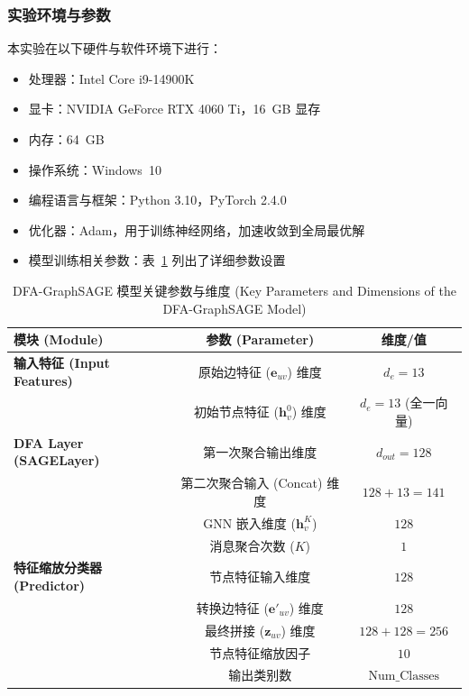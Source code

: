 \documentclass{article}
\begin{document}
\subsubsection{实验环境与参数}
本实验在以下硬件与软件环境下进行：
\begin{itemize}
  \item 处理器：Intel Core i9-14900K
  \item 显卡：NVIDIA GeForce RTX 4060 Ti，16~GB 显存
  \item 内存：64~GB
  \item 操作系统：Windows~10
  \item 编程语言与框架：Python 3.10，PyTorch 2.4.0
  \item 优化器：Adam，用于训练神经网络，加速收敛到全局最优解
  \item 模型训练相关参数：表~\ref{tab:dfasage_parameters} 列出了详细参数设置
\end{itemize}

\begin{table}[H]
  \centering
  \caption{DFA-GraphSAGE 模型关键参数与维度 (Key Parameters and Dimensions of
  the DFA-GraphSAGE Model)}
  \label{tab:dfasage_parameters}
  \begin{tabular}{lcc}
    \toprule %
    \textbf{模块 (Module)} & \textbf{参数 (Parameter)} & \textbf{维度/值 } \\
    \midrule %
    \textbf{输入特征 (Input Features)} & 原始边特征 ($\mathbf{e}_{uv}$) 维度 & $d_e=13$ \\
    & 初始节点特征 ($\mathbf{h}_v^0$) 维度 & $d_{e}=13$ (全一向量) \\
    \midrule %
    \textbf{DFA Layer (SAGELayer)} & 第一次聚合输出维度 & $d_{out}=128$ \\
    & 第二次聚合输入 (Concat) 维度 & $128 + 13 = 141$ \\
    & GNN 嵌入维度 ($\mathbf{h}_v^K$) & $128$ \\
    & 消息聚合次数 ($K$) & $1$ \\
    \midrule %
    \textbf{特征缩放分类器 (Predictor)} & 节点特征输入维度 & $128$ \\
    & 转换边特征 ($\mathbf{e}'_{uv}$) 维度 & $128$ \\
    & 最终拼接 ($\mathbf{z}_{uv}$) 维度 & $128 + 128 = 256$ \\
    & 节点特征缩放因子 & $10$ \\
    & 输出类别数 & $\text{Num\_Classes}$ \\
    \bottomrule %
  \end{tabular}
\end{table}
\end{document}
